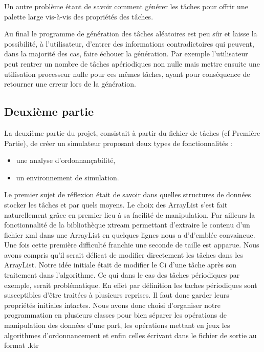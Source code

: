 Un autre problème étant de savoir comment générer les tâches pour offrir une palette large vis-à-vis des propriétés des tâches.

Au final le programme de génération des tâches aléatoires est peu sûr et laisse la possibilité, à l'utilisateur, d'entrer des informations contradictoires qui peuvent, dans la majorité des cas, faire échouer la génération.
Par exemple l'utilisateur peut rentrer un nombre de tâches apériodiques non nulle mais mettre ensuite une utilisation processeur nulle pour ces mêmes tâches, ayant pour conséquence de retourner une erreur lors de la génération.

\subsection{Deuxième partie}\label{Part2}
La deuxième partie du projet, consistait à partir du fichier de tâches (cf Première Partie), de créer un simulateur proposant  deux types de fonctionnalités :
\begin{itemize}
\item
une analyse d'ordonnançabilité,
\item
un environnement de simulation.
\end{itemize}
Le premier sujet de réflexion était de savoir dans quelles structures de données stocker les tâches et par quels moyens. Le choix des ArrayList s'est fait naturellement grâce en premier lieu à sa facilité de manipulation. Par ailleurs la fonctionnalité de la bibliothèque xtream permettant d'extraire le contenu d'un fichier xml dans une ArrayList en quelques lignes nous a d'd'emblée convaincue. Une fois cette première difficulté franchie une seconde de taille est apparue. Nous avons compris qu'il serait délicat de modifier directement les tâches dans les ArrayList. Notre idée initiale était de  modifier le Ci d'une  tâche après son traitement dans l'algorithme. Ce qui dans le cas des tâches périodiques par exemple, serait problématique. En effet par définition les taches périodiques  sont susceptibles  d'être traitées à plusieurs reprises. Il faut donc garder leurs propriétés initiales intactes. Nous avons donc choisi d'organiser notre programmation en plusieurs classes pour bien séparer les opérations de manipulation des données d'une part, les opérations mettant en jeux les algorithmes d'ordonnancement et enfin celles écrivant dans le fichier de sortie au format .ktr

